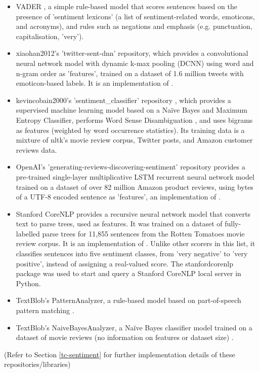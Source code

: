 \documentclass{report}
\begin{document}
\begin{itemize}
	\item VADER \cite{VADER}, a simple rule-based model that scores sentences based on the presence of 'sentiment lexicons' (a list of sentiment-related words, emoticons, and acronyms), and rules such as negations and emphasis (e.g. punctuation, capitalisation, 'very').
	\item xiaohan2012's 'twitter-sent-dnn' repository, which provides a convolutional neural 	network model with dynamic k-max pooling (DCNN) using word and n-gram order as 'features', trained on a dataset of 1.6 million tweets with emoticon-based labels. 
		It is an implementation of \cite{kalchbrennerACL2014}.
	\item kevincobain2000's 'sentiment\_classifier' repository \cite{kevincobain}, which provides a supervised machine learning model based on a Na\"{i}ve Bayes and Maximum Entropy Classifier, performs Word Sense Disambiguation \cite{banerjee2002adapted}, and uses bigrams as features (weighted by word occurrence statistics).
		Its training data is a mixture of nltk's movie review corpus, Twitter posts, and Amazon customer reviews data.
	\item OpenAI's 'generating-reviews-discovering-sentiment' repository provides a pre-trained single-layer multiplicative LSTM recurrent neural network model trained on a dataset of over 82 million Amazon product reviews, using bytes of a UTF-8 encoded sentence as 'features', an implementation of \cite{OpenAI}.
	\item Stanford CoreNLP \cite{StanfordNLP} provides a recursive neural network model that converts text to parse trees, used as features. 
	It was trained on a dataset of fully-labelled parse trees for 11,855 sentences from the Rotten Tomatoes movie review corpus.
	It is an implementation of \cite{socher2013recursive}.
	Unlike other scorers in this list, it classifies sentences into five sentiment classes, from 'very negative' to 'very positive', instead of assigning a real-valued score.
	The stanfordcorenlp package \cite{stanfordcorenlp} was used to start and query a Stanford CoreNLP local server in Python.
	\item TextBlob's PatternAnalyzer, a rule-based model based on part-of-speech pattern matching \cite{textblob}.
	\item TextBlob's NaiveBayesAnalyzer, a Na\"{i}ve Bayes classifier model trained on a dataset of movie reviews (no information on features or dataset size) \cite{textblob}.
\end{itemize}
(Refer to Section \ref{tc-sentiment} for further implementation details of these repositories/libraries)
\end{document}
